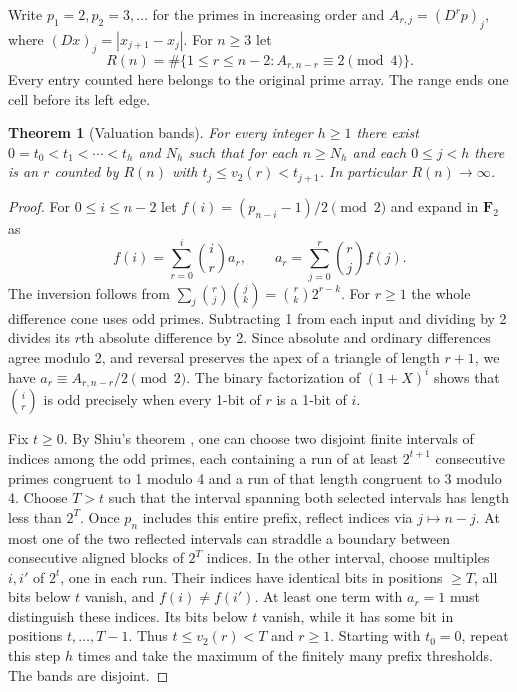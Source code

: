 \documentclass[11pt,a4paper]{article}
\newtheorem{theorem}{Theorem}[section]
\begin{document}
Write $p_1=2,p_2=3,\ldots$ for the primes in increasing order and
$A_{r,j}=(D^rp)_j$, where $(Dx)_j=|x_{j+1}-x_j|$.
For $n\ge3$ let
\[
 R(n)=\#\{1\le r\le n-2:A_{r,n-r}\equiv2\pmod4\}.
\]
Every entry counted here belongs to the original prime array.
The range ends one cell before its left edge.

\begin{theorem}[Valuation bands] For every integer $h\ge1$ there exist
$0=t_0<t_1<\cdots<t_h$ and $N_h$ such that for each $n\ge N_h$
and each $0\le j<h$ there is an $r$ counted by $R(n)$ with
$t_j\le v_2(r)<t_{j+1}$. In particular $R(n)\to\infty$.\end{theorem}

\begin{proof}
For $0\le i\le n-2$ let
$f(i)=(p_{n-i}-1)/2\pmod2$ and expand in $\mathbf F_2$ as
\[
 f(i)=\sum_{r=0}^i \binom{i}{r}a_r,\qquad
 a_r=\sum_{j=0}^r \binom{r}{j} f(j).
\]
The inversion follows from
$\sum_j\binom{r}{j}\binom{j}{k}=\binom{r}{k}2^{r-k}$.
For $r\ge1$ the whole difference cone uses odd primes. Subtracting 1
from each input and dividing by 2 divides its $r$th absolute difference
by 2. Since absolute and ordinary differences agree modulo 2, and
reversal preserves the apex of a triangle of length $r+1$, we have
$a_r\equiv A_{r,n-r}/2\pmod2$. The binary factorization of
$(1+X)^i$ shows that $\binom{i}{r}$ is odd precisely when every 1-bit of
$r$ is a 1-bit of $i$.

Fix $t\ge0$. By Shiu's theorem \cite{shiu}, one can choose two disjoint
finite intervals of indices among the odd primes, each containing a run
of at least $2^{t+1}$ consecutive primes congruent to 1 modulo 4 and
a run of that length congruent to 3 modulo 4. Choose $T>t$ such that
the interval spanning both selected intervals has length less than $2^T$.
Once $p_n$ includes this entire prefix, reflect indices via $j\mapsto n-j$.
At most one of the two reflected intervals can straddle a boundary
between consecutive aligned blocks of $2^T$ indices. In the other interval,
choose multiples $i,i'$ of $2^t$, one in each run. Their indices have
identical bits in positions $\ge T$, all bits below $t$ vanish, and
$f(i)\ne f(i')$. At least one term with $a_r=1$ must distinguish these
indices. Its bits below $t$ vanish, while it has some bit in positions
$t,\ldots,T-1$. Thus $t\le v_2(r)<T$ and $r\ge1$.
Starting with $t_0=0$, repeat this step $h$ times and take the maximum
of the finitely many prefix thresholds. The bands are disjoint.
\end{proof}
\end{document}
